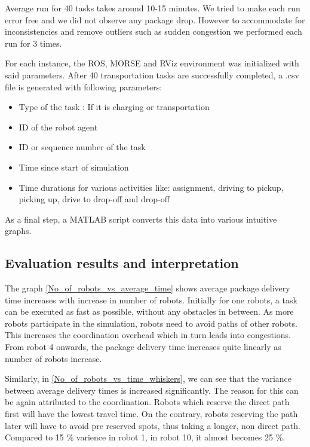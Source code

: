 \documentclass[journal]{IEEEtran}
\begin{document}
Average run for 40 tasks takes around 10-15 minutes. We tried to make each run error free and we did not observe any package drop. However to accommodate for inconsistencies and remove outliers such as sudden congestion we performed each run for 3 times. 

For each instance, the ROS, MORSE and RViz environment was initialized with said parameters. After 40 transportation tasks are successfully completed, a .csv file is generated with following parameters:
\begin{itemize}
\item Type of the task : If it is charging or transportation
\item ID of the robot agent  
\item ID or sequence number of the task
\item Time since start of simulation
\item Time durations for various activities like: assignment, driving to pickup, picking up, drive to drop-off and drop-off 
\end{itemize}

As a final step, a MATLAB script converts this data into various intuitive graphs. 

\subsection{Evaluation results and interpretation}

The graph \ref{No_of_robots_vs_average_time} shows average package delivery time increases with increase in number of robots.  Initially for one robots, a task can be executed as fast as possible, without any obstacles in between. As more robots participate in the simulation, robots need to avoid paths of other robots. This increases the coordination overhead which in turn leads into congestions. From robot 4 onwards, the package delivery time increases quite linearly as number of robots increase.

Similarly, in \ref{No_of_robots_vs_time_whiskers}, we can see that the variance between average delivery times is increased significantly. The reason for this can be again attributed to the coordination. Robots which reserve the direct path first will have the lowest travel time. On the contrary, robots reserving the path later will have to avoid pre reserved spots, thus taking a longer, non direct path. Compared to 15 \% varience in robot 1,  in robot 10, it almost becomes 25 \%.  
\end{document}
